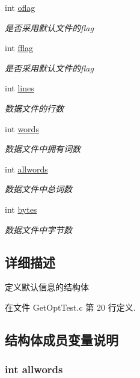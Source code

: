 \begin{DoxyCompactItemize}
int \hyperlink{structglobal_args__t_ae48c37db113eec555c7f4ce2e48e90de}{oflag}
\begin{DoxyCompactList}\small\item\em 是否采用默认文件的flag \end{DoxyCompactList}\item 
int \hyperlink{structglobal_args__t_aab9e30d72b4b6af02ce19b24422ad2ce}{fflag}
\begin{DoxyCompactList}\small\item\em 是否采用默认文件的flag \end{DoxyCompactList}\item 
int \hyperlink{structglobal_args__t_a9921ae02cadccc99dd6c3a9b68be050a}{lines}
\begin{DoxyCompactList}\small\item\em 数据文件的行数 \end{DoxyCompactList}\item 
int \hyperlink{structglobal_args__t_a76f30ccb790f9ab7ef115f30cf735cd5}{words}
\begin{DoxyCompactList}\small\item\em 数据文件中拥有词数 \end{DoxyCompactList}\item 
int \hyperlink{structglobal_args__t_ac3711469fee92b6ca802a757ef8676e2}{allwords}
\begin{DoxyCompactList}\small\item\em 数据文件中总词数 \end{DoxyCompactList}\item 
int \hyperlink{structglobal_args__t_a3e18e5ab1201e205ce88c473a2f4bf99}{bytes}
\begin{DoxyCompactList}\small\item\em 数据文件中字节数 \end{DoxyCompactList}\end{DoxyCompactItemize}


\subsection{详细描述}
定义默认信息的结构体 

在文件 Get\-Opt\-Test.\-c 第 20 行定义.



\subsection{结构体成员变量说明}
\hypertarget{structglobal_args__t_ac3711469fee92b6ca802a757ef8676e2}{
\subsubsection[{allwords}]{\setlength{\rightskip}{0pt plus 5cm}int allwords}}\label{structglobal_args__t_ac3711469fee92b6ca802a757ef8676e2}


